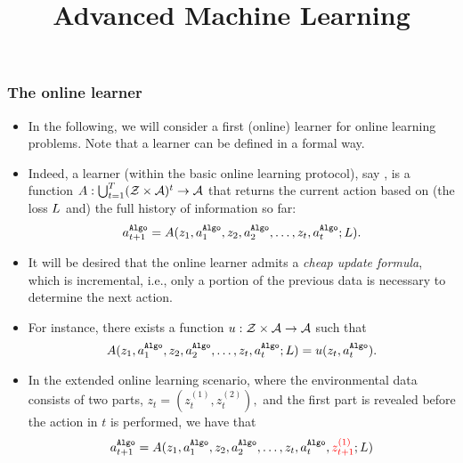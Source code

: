 \documentclass[11pt,compress,t,notes=noshow, xcolor=table]{beamer}
\title{Advanced Machine Learning}
\date{}
\begin{document}



\sloppy


\begin{frame}
	\frametitle{The online learner}
	\small
	\begin{itemize}
		\item In the following, we will consider a first (online) learner for   online learning problems. Note that a learner can be defined in a formal way.
		\item Indeed, a learner (within the basic online learning protocol), say \Algo, is a function $A: \bigcup_{t=1}^T (\mathcal{Z} \times \mathcal{A})^t \to \mathcal{A}$ that returns the current action based on (the loss $L$ and) the full history of information so far:
		$$	a_{t+1}^{\texttt{Algo}} = A(z_1,a_1^{\texttt{Algo}},z_2,a_2^{\texttt{Algo}},\ldots,z_t,a_t^{\texttt{Algo}};L).		$$
		 \item It will be desired that the online learner admits a \emph{cheap update formula}, which is incremental, i.e., only a portion of the previous data is necessary to determine the next action.
		 \item  For instance, there exists a function $u:\mathcal{Z} \times \mathcal{A} \to \mathcal{A}$ such that 
		$$	A(z_1,a_1^{\texttt{Algo}},z_2,a_2^{\texttt{Algo}},\ldots,z_t,a_t^{\texttt{Algo}};L) = u(z_t,a_t^{\texttt{Algo}}).$$
%		
		\item In the extended online learning scenario, where the environmental data consists of two parts, $z_t=(z_t^{(1)},z_t^{(2)}   ),$ and the {\color{red}first part is revealed before the action in $t$ is performed}, we have that
				$$	a_{t+1}^{\texttt{Algo}} =  A(z_1,a_1^{\texttt{Algo}},z_2,a_2^{\texttt{Algo}},\ldots,z_t,a_t^{\texttt{Algo}},{\color{red} z_{t+1}^{(1)}};L)  		$$
				 
	\end{itemize}
\end{frame}
\end{document}
